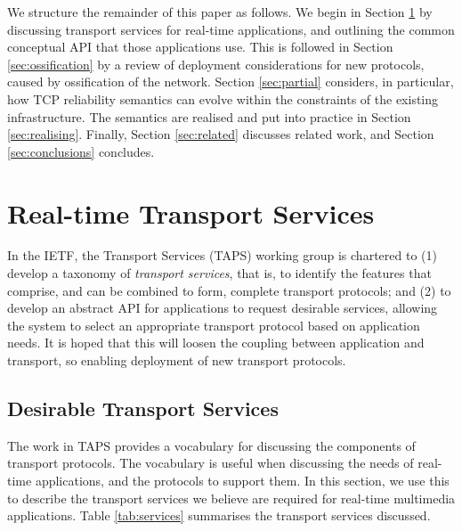 \documentclass{sig-alternate-05-2015}
\begin{document}
We structure the remainder of this paper as follows.
We begin in Section \ref{sec:services} by discussing transport
services for real-time applications, and outlining the common
conceptual API that those applications use. This is followed in
Section \ref{sec:ossification} by a review of deployment
considerations for new protocols, caused by ossification of the
network. Section \ref{sec:partial} considers, in particular, how TCP
reliability semantics can evolve within the constraints of the
existing infrastructure. The semantics are realised and put into
practice in Section \ref{sec:realising}.
Finally, Section \ref{sec:related} discusses related work, and Section
\ref{sec:conclusions} concludes.

\section{Real-time Transport Services}
\label{sec:services}

In the IETF, the Transport Services (TAPS) working group is chartered to
(1) develop a taxonomy of \emph{transport services}, that is, to identify the
features that comprise, and can be combined to form, complete transport
protocols; and (2) to develop an abstract API for applications to request
desirable services, allowing the system to select an appropriate transport
protocol based on application needs. It is hoped that this will loosen the
coupling between application and transport, so enabling deployment of new
transport protocols.

\subsection{Desirable Transport Services}

The work in TAPS provides a vocabulary for discussing the components of
transport protocols. The vocabulary is useful when discussing the needs 
of real-time applications, and the protocols to support them. In this 
section, we use this to describe the transport services we believe are
required for real-time multimedia applications.
Table \ref{tab:services} summarises the transport services discussed.
\end{document}
